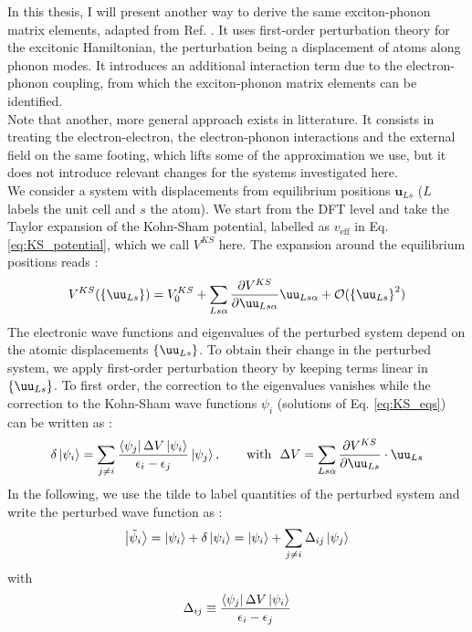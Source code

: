 In this thesis, I will present another way to derive the same exciton-phonon matrix elements, adapted from Ref. \cite{chen2020exciton}. It uses first-order perturbation theory for the excitonic Hamiltonian, the perturbation being a displacement of atoms along phonon modes. It introduces an additional interaction term due to the electron-phonon coupling, from which the exciton-phonon matrix elements can be identified. \\
Note that another, more general approach exists in litterature. It consists in treating the electron-electron, the electron-phonon interactions and the external field on the same footing,\cite{paleari2022exciton} which lifts some of the approximation we use, but it does not introduce relevant changes for the systems investigated here.\\

We consider a system with displacements from equilibrium positions $\boldsymbol{u}_{Ls}$ ($L$ labels the unit cell and $s$ the atom). We start from the \acrshort{DFT} level and take the Taylor expansion of the Kohn-Sham potential, labelled as $v_{\text{eff}}$ in Eq. \eqref{eq:KS_potential}, which we call $V^{KS}$ here. The expansion around the equilibrium positions reads :
\begin{equation}
    V^{KS}(\left\{ \uu_{Ls} \right\}) = V_0^{KS} + \sum_{Ls\alpha} \frac{\partial V^{KS}}{\partial \uu_{Ls\alpha}} \uu_{Ls\alpha} + \mathcal{O}(\left\{ \uu_{Ls} \right\}^2)
\end{equation}
The electronic wave functions and eigenvalues of the perturbed system depend on the atomic displacements $\left\{ \uu_{Ls} \right\}$. To obtain their change in the perturbed system, we apply first-order perturbation theory by keeping terms linear in $\left\{ \uu_{Ls} \right\}$. To first order, the correction to the eigenvalues vanishes while the correction to the Kohn-Sham wave functions $\psi_i$ (solutions of Eq. \eqref{eq:KS_eqs}) can be written as : 
\begin{equation}
    \delta\ket{\psi_i} = \sum_{j\neq i} \frac{\bra{\psi_j} \Delta V \ket{\psi_i}}{\epsilon_i - \epsilon_j} \ket{\psi_j}, \qquad \text{with} \ \ \Delta V = \sum_{Ls\alpha}\frac{\partial V^{KS}}{\partial \uu_{Ls}}\cdot \uu_{Ls}
\end{equation}
In the following, we use the tilde to label quantities of the perturbed system and write the perturbed wave function as :
\begin{equation}
    \ket{\tilde{\psi}_i} = \ket{\psi_i} + \delta\ket{\psi_i} = \ket{\psi_i} + \sum_{j \neq i} \Delta_{ij} \ket{\psi_j} \label{eq:perturb_wf}
\end{equation}
with
\begin{equation}
    \Delta_{ij} \equiv \frac{\bra{\psi_j} \Delta V \ket{\psi_i}}{\epsilon_i - \epsilon_j} \label{eq:Delta_var}
\end{equation}

